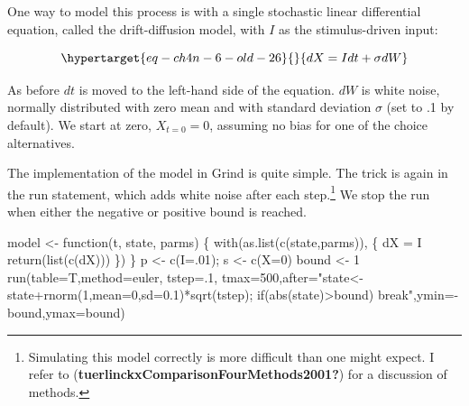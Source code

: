 \documentclass[
  a4paper,
  DIV=11,
  numbers=noendperiod,
  oneside]{scrreprt}
\newenvironment{Shaded}{\begin{snugshade}}{\end{snugshade}}
\newcommand{\AttributeTok}[1]{\textcolor[rgb]{0.40,0.45,0.13}{#1}}
\newcommand{\ControlFlowTok}[1]{\textcolor[rgb]{0.00,0.23,0.31}{#1}}
\newcommand{\DecValTok}[1]{\textcolor[rgb]{0.68,0.00,0.00}{#1}}
\newcommand{\FunctionTok}[1]{\textcolor[rgb]{0.28,0.35,0.67}{#1}}
\newcommand{\NormalTok}[1]{\textcolor[rgb]{0.00,0.23,0.31}{#1}}
\newcommand{\OtherTok}[1]{\textcolor[rgb]{0.00,0.23,0.31}{#1}}
\newcommand{\SpecialCharTok}[1]{\textcolor[rgb]{0.37,0.37,0.37}{#1}}
\newcommand{\StringTok}[1]{\textcolor[rgb]{0.13,0.47,0.30}{#1}}
\begin{document}
One way to model this process is with a single stochastic linear
differential equation, called the drift-diffusion model, with \(I\) as
the stimulus-driven input:

\begin{equation}\protect\hypertarget{eq-ch4n-6-old-26}{}{
dX = Idt + \sigma dW
}\label{eq-ch4n-6-old-26}\end{equation}

As before \(dt\) is moved to the left-hand side of the equation. \(dW\)
is white noise, normally distributed with zero mean and with standard
deviation \(\sigma\) (set to .1 by default). We start at zero,
\(X_{t = 0} = 0\), assuming no bias for one of the choice alternatives.

The implementation of the model in Grind is quite simple. The trick is
again in the run statement, which adds white noise after each
step.\footnote{Simulating this model correctly is more difficult than
  one might expect. I refer to
  (\textbf{tuerlinckxComparisonFourMethods2001?}) for a discussion of
  methods.} We stop the run when either the negative or positive bound
is reached.

\begin{Shaded}
\begin{Highlighting}[]
\NormalTok{model }\OtherTok{\textless{}{-}} \ControlFlowTok{function}\NormalTok{(t, state, parms) \{}
  \FunctionTok{with}\NormalTok{(}\FunctionTok{as.list}\NormalTok{(}\FunctionTok{c}\NormalTok{(state,parms)), \{}
\NormalTok{    dX }\OtherTok{=}\NormalTok{ I}
    \FunctionTok{return}\NormalTok{(}\FunctionTok{list}\NormalTok{(}\FunctionTok{c}\NormalTok{(dX)))}
\NormalTok{  \})}
\NormalTok{\}}
\NormalTok{p }\OtherTok{\textless{}{-}} \FunctionTok{c}\NormalTok{(}\AttributeTok{I=}\NormalTok{.}\DecValTok{01}\NormalTok{); s }\OtherTok{\textless{}{-}} \FunctionTok{c}\NormalTok{(}\AttributeTok{X=}\DecValTok{0}\NormalTok{)}
\NormalTok{bound }\OtherTok{\textless{}{-}} \DecValTok{1}
\FunctionTok{run}\NormalTok{(}\AttributeTok{table=}\NormalTok{T,}\AttributeTok{method=}\StringTok{\textquotesingle{}euler\textquotesingle{}}\NormalTok{, }\AttributeTok{tstep=}\NormalTok{.}\DecValTok{1}\NormalTok{,}
    \AttributeTok{tmax=}\DecValTok{500}\NormalTok{,}\AttributeTok{after=}\StringTok{"state\textless{}{-}state+rnorm(1,mean=0,sd=0.1)*sqrt(tstep);}
\StringTok{    if(abs(state)\textgreater{}bound) break"}\NormalTok{,}\AttributeTok{ymin=}\SpecialCharTok{{-}}\NormalTok{bound,}\AttributeTok{ymax=}\NormalTok{bound)}
\end{Highlighting}
\end{Shaded}
\end{document}
